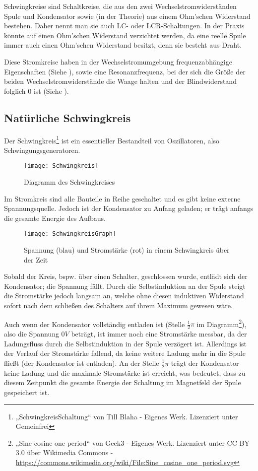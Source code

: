 Schwingkreise sind Schaltkreise, die aus den zwei Wechselstromwiderständen Spule und Kondensator sowie (in der Theorie) aus einem Ohm'schen Widerstand bestehen. Daher nennt man sie auch LC- oder LCR-Schaltungen. In der Praxis könnte auf einen Ohm'schen Widerstand verzichtet werden, da eine reelle Spule immer auch einen Ohm'schen Widerstand besitzt, denn sie besteht aus Draht. 

Diese Stromkreise haben in der Wechselstromumgebung frequenzabhängige Eigenschaften (Siehe ), sowie eine Resonanzfrequenz, bei der sich die Größe der beiden Wechselstromwiderstände die Waage halten und der Blindwiderstand folglich $0$ ist (Siehe ).

\subsection{Natürliche Schwingkreis}

Der Schwingkreis\footnote{„SchwingkreisSchaltung“ von Till Blaha - Eigenes Werk. Lizenziert unter Gemeinfrei} ist ein essentieller Bestandteil von Oszillatoren, also Schwingungsgeneratoren. 

\begin{figure}[h!]
	\centering
	\texttt{[image: Schwingkreis]}
	\caption{Diagramm des Schwingkreises}
\end{figure}

Im Stromkreis sind alle Bauteile in Reihe geschaltet und es gibt keine externe Spannungsquelle. Jedoch ist der Kondensator zu Anfang geladen; er trägt anfangs die gesamte Energie des Aufbaus.

\begin{figure}[h!]
	\centering
	\texttt{[image: SchwingkreisGraph]}
	\caption{Spannung (blau) und Stromstärke (rot) in einem Schwingkreis über der Zeit}
\end{figure}

Sobald der Kreis, bspw. über einen Schalter, geschlossen wurde, entlädt sich der Kondensator; die Spannung fällt. Durch die Selbstinduktion an der Spule steigt die Stromstärke jedoch langsam an, welche ohne diesen induktiven Widerstand sofort nach dem schließen des Schalters auf ihrem Maximum gewesen wäre.

Auch wenn der Kondensator vollständig entladen ist (Stelle $\frac{1}{2}\pi$ im Diagramm\footnote{„Sine cosine one period“ von Geek3 - Eigenes Werk. Lizenziert unter CC BY 3.0 über Wikimedia Commons - \url{https://commons.wikimedia.org/wiki/File:Sine_cosine_one_period.svg}}), also die Spannung $0V$ beträgt, ist immer noch eine Stromstärke messbar, da der Ladungsfluss durch die Selbstinduktion in der Spule verzögert ist. Allerdings ist der Verlauf der Stromstärke fallend, da keine weitere Ladung mehr in die Spule fließt (der Kondensator ist entladen). An der Stelle $\frac{1}{2}\pi$ trägt der Kondensator keine Ladung und die maximale Stromstärke ist erreicht, was bedeutet, dass zu diesem Zeitpunkt die gesamte Energie der Schaltung im Magnetfeld der Spule gespeichert ist.


